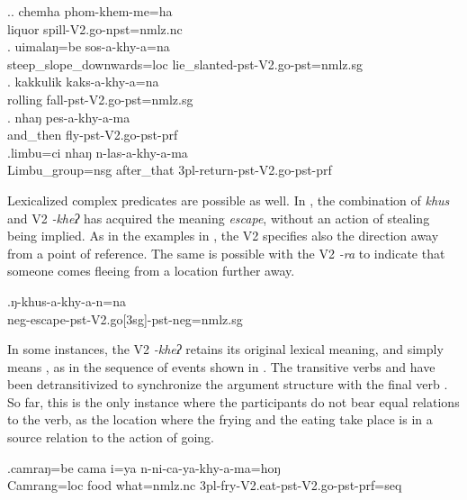 	\ex.\ag. chemha phom-khem-me=ha\\
	liquor spill{\sc [3sg]-V2.go-npst=nmlz.nc}\\
	\bg.  uimalaŋ=be sos-a-khy-a=na\\
	 steep\_slope\_downwards{\sc =loc} lie\_slanted{\sc [3sg]-pst-V2.go-pst=nmlz.sg}\\
		\bg. kakkulik kaks-a-khy-a=na\\
	rolling fall{\sc [3sg]-pst-V2.go-pst=nmlz.sg}\\
	\bg. nhaŋ    pes-a-khy-a-ma\\
	and\_then fly{\sc [3sg]-pst-V2.go-pst-prf}\\
	  
\bg.limbu=ci            nhaŋ    n-las-a-khy-a-ma\\
Limbu\_group{\sc =nsg} after\_that {\sc 3pl-}return{\sc -pst-V2.go-pst-prf}\\
 
	

Lexicalized complex predicates are possible as well. In \Next, the combination of \emph{khus}  and V2 \emph{-kheʔ}  has acquired the meaning \emph{escape}, without an action of stealing being implied. As in the examples in \Last, the V2 specifies also the direction away from a point of reference. The same is possible with the V2 \emph{-ra}  to indicate that someone comes fleeing from a location further away.

\exg.ŋ-khus-a-khy-a-n=na\\
{\sc neg-}escape{\sc -pst-V2.go[3sg]-pst-neg=nmlz.sg}\\

In some instances, the V2 \emph{-kheʔ} retains its original lexical meaning, and simply means , as in the sequence of events shown in \Next. The transitive verbs  and  have been detransitivized to synchronize the argument structure with the final verb . So far, this is the only instance where the participants do not bear equal relations to the verb, as the location where the frying and the eating  take place is in a source relation to the action of going. 

\exg.camraŋ=be    cama i=ya           n-ni-ca-ya-khy-a-ma=hoŋ\\
Camrang{\sc =loc} food what{\sc =nmlz.nc} {\sc 3pl-}fry{\sc -V2.eat-pst-V2.go-pst-prf=seq}\\
 
